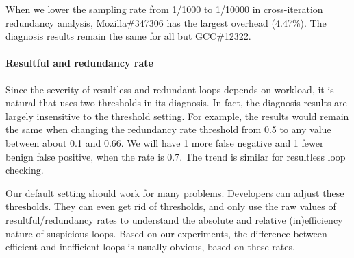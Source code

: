 When we lower the sampling rate from 1/1000 to 1/10000
in cross-iteration redundancy analysis,
Mozilla\#347306 has the largest overhead (4.47\%). 
The diagnosis results remain 
the same for all but GCC\#12322.

\paragraph{Resultful and redundancy rate}
Since the severity of resultless and redundant loops depends on
workload, it is natural that \Tool uses two thresholds in its diagnosis.
In fact, the diagnosis results are largely insensitive to the threshold
setting. For example, the results would remain the same when
changing the redundancy rate threshold from 0.5 to any value between about
0.1 and 0.66. We will have 1 more false negative and 1 fewer benign false positive, 
when the rate is 0.7. The trend is similar for resultless
loop checking. 

Our default setting %
should work for many problems.
Developers can adjust these thresholds. 
They can even get rid of thresholds, and only
use the raw values of resultful/redundancy rates to understand
the absolute and relative (in)efficiency nature of suspicious 
loops. Based on our experiments, the difference between efficient and inefficient
loops is usually obvious, based on these rates.


